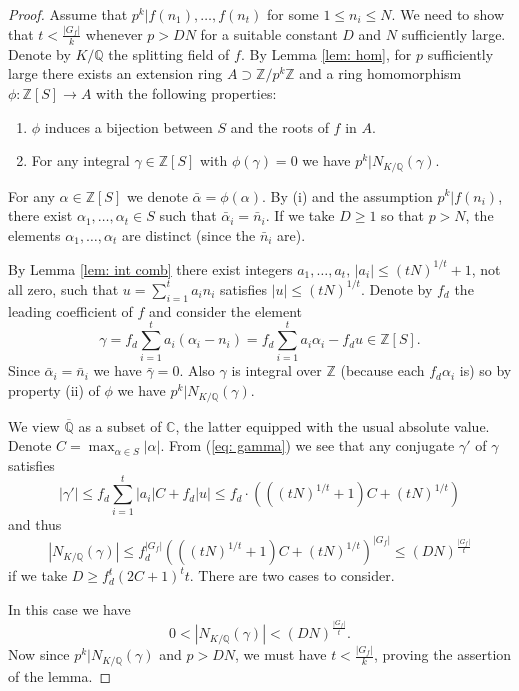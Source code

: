 \documentclass[alphabetic]{amsart}
\theoremstyle{definition}
\numberwithin{equation}{section}
\newcommand{\case}[1]{\vspace{0.3cm}\noindent\framebox{#1.}}
\newcommand{\Z}{{\mathbb Z}}
\newcommand{\Q}{{\mathbb Q}}
\newcommand{\Qb}{{\overline{\Q}}}
\newcommand{\C}{{\mathbb C}}
\numberwithin{equation}{section}
\begin{document}
\begin{proof} 
Assume that $p^k|f(n_1),\ldots,f(n_t)$ for some $1\le n_i\le N$. We need to show that $t<\frac{|G_f|}k$ whenever $p>DN$ for a suitable constant $D$ and $N$ sufficiently large. Denote by $K/\Q$ the splitting field of $f$. By Lemma \ref{lem: hom}, for $p$ sufficiently large there exists an extension ring $A\supset \Z/p^k\Z$ and a ring homomorphism $\phi:\Z[S]\to A$ with the following properties:
\begin{enumerate}
    \item[(i)] $\phi$ induces a bijection between $S$ and the roots of $f$ in $A$.
    \item[(ii)] For any integral $\gamma\in\Z[S]$ with $\phi(\gamma)=0$ we have $p^k|N_{K/\Q}(\gamma)$.
\end{enumerate}
For any $\alpha\in\Z[S]$ we denote $\bar\alpha=\phi(\alpha)$.
By (i) and the assumption $p^k|f(n_i)$, there exist $\alpha_1,\ldots,\alpha_t\in S$ such that $\bar\alpha_i=\bar n_i$. If we take $D\ge 1$ so that $p>N$, the elements $\alpha_1,\ldots,\alpha_t$ are distinct (since the $\bar n_i$ are). 

 By Lemma \ref{lem: int comb} there exist integers $a_1,\ldots,a_t,\,|a_i|\le (tN)^{1/t}+1$, not all zero, such that $u=\sum_{i=1}^ta_in_i$ satisfies $|u|\le (tN)^{1/t}$. 
Denote by $f_d$ the leading coefficient of $f$ and consider the element
\begin{equation}\label{eq: gamma}\gamma=f_d\sum_{i=1}^ta_i(\alpha_i-n_i)=f_d\sum_{i=1}^t a_i\alpha_i-f_du\in\Z[S].\end{equation}
Since $\bar\alpha_i=\bar n_i$ we have $\bar\gamma=0$. Also $\gamma$ is integral over $\Z$ (because each $f_d\alpha_i$ is) so by property (ii) of $\phi$ we have $p^k|N_{K/\Q}(\gamma).$
 
 We view $\Qb$ as a subset of $\C$, the latter equipped with the usual absolute value. Denote $C=\max_{\alpha\in S}|\alpha|$.
 From (\ref{eq: gamma}) we see that any conjugate $\gamma'$ of $\gamma$ satisfies
 $$|\gamma'|\le f_d\sum_{i=1}^t|a_i|C+f_d|u|\le f_d\cdot\left(((tN)^{1/t}+1)C+(tN)^{1/t}\right)$$ and thus
$$|N_{K/\Q}(\gamma)|\le f_d^{|G_f|}(((tN)^{1/t}+1)C+(tN)^{1/t})^{|G_f|}\le (DN)^{\frac{|G_f|}{t}}$$ if we take $D\ge f_d^t(2C+1)^tt$.
 There are two cases to consider.

\case{$\gamma\neq 0$} In this case we have 
$$0<|N_{K/\Q}(\gamma)|<(DN)^{\frac{|G_f|}t}.$$ 
Now since $p^k|N_{K/\Q}(\gamma)$
and $p>DN$, we must have $t<\frac{|G_f|}k$, proving the assertion of the lemma.


\end{proof}
\end{document}

